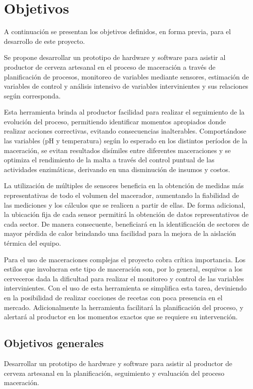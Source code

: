\section{Objetivos}
    \par
    A continuación se presentan los objetivos definidos, en forma previa, para el desarrollo de este proyecto.
    \par
    Se propone desarrollar un prototipo de hardware y software para asistir al productor de cerveza artesanal en el proceso de maceración a través de planificación de procesos, monitoreo de variables mediante sensores, estimación de variables de control y análisis intensivo de variables intervinientes y sus relaciones según corresponda.
    \par
    Esta herramienta brinda al productor facilidad para realizar el seguimiento de la evolución del proceso, permitiendo identificar momentos apropiados donde realizar acciones correctivas, evitando consecuencias inalterables. Comportándose las variables (pH y temperatura) según lo esperado en los distintos períodos de la maceración, se evitan resultados disímiles entre diferentes maceraciones y se optimiza el rendimiento de la malta a través del control puntual de las actividades enzimáticas, derivando en una disminución de insumos y costos.
    \par
    La utilización de múltiples de sensores beneficia en la obtención de medidas más representativas de todo el volumen del macerador, aumentando la fiabilidad de las mediciones y los cálculos que se realicen a partir de ellas. De forma adicional, la ubicación fija de cada sensor permitirá la obtención de datos representativos de cada sector. De manera consecuente, beneficiará en la identificación de sectores de mayor pérdida de calor brindando una facilidad para la mejora de la aislación térmica del equipo.
    \par
    Para el uso de maceraciones complejas el proyecto cobra crítica importancia. Los estilos que involucran este tipo de maceración son, por lo general, esquivos a los cerveceros dada la dificultad para realizar el monitoreo y control de las variables intervinientes. Con el uso de esta herramienta se simplifica esta tarea, deviniendo en la posibilidad de realizar cocciones de recetas con poca presencia en el mercado. Adicionalmente la herramienta facilitará la planificación del proceso, y alertará al productor en los momentos exactos que se requiere su intervención.


    \subsection{Objetivos generales}
        \par
        Desarrollar un prototipo de hardware y software para asistir al productor de cerveza artesanal en la planificación, seguimiento y evaluación del proceso maceración. 
